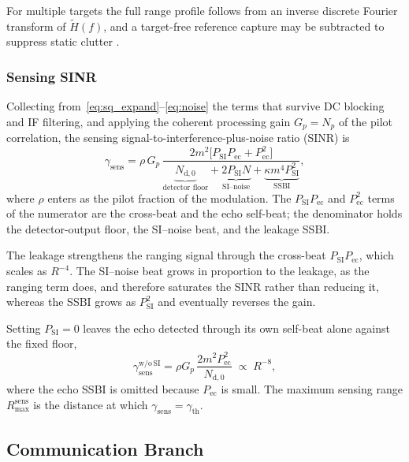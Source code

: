 \documentclass[10pt,journal,comsoc]{IEEEtran}
\begin{document}
For multiple targets the full range profile follows from an inverse
discrete Fourier transform of $\tilde H(f)$, and a target-free
reference capture may be subtracted to suppress static clutter
\cite{sturm_waveform_2011}.

\subsubsection{Sensing SINR}
Collecting from~\eqref{eq:sq_expand}--\eqref{eq:noise} the terms that
survive DC blocking and IF filtering, and applying the coherent
processing gain $G_p=N_p$ of the pilot correlation, the sensing
signal-to-interference-plus-noise ratio (SINR) is
\begin{equation}
\gamma_{\mathrm{sens}}=\rho\,G_p\,
\frac{2m^2\big[P_{\mathrm{SI}}P_{\mathrm{ec}}+P_{\mathrm{ec}}^2\big]}
{\underbrace{N_{\mathrm{d},0}}_{\text{detector floor}}
+\underbrace{2P_{\mathrm{SI}}N}_{\text{SI--noise}}
+\underbrace{\kappa m^4P_{\mathrm{SI}}^2}_{\text{SSBI}}},
\label{eq:sinr_sens}
\end{equation}
where $\rho$ enters as the pilot fraction of the modulation. The
$P_{\mathrm{SI}}P_{\mathrm{ec}}$ and $P_{\mathrm{ec}}^2$ terms of the
numerator are the cross-beat and the echo self-beat; the denominator
holds the detector-output floor, the SI--noise beat,
and the leakage SSBI.

The leakage strengthens the ranging signal through the cross-beat
$P_{\mathrm{SI}}P_{\mathrm{ec}}$, which scales as $R^{-4}$. The
SI--noise beat grows in proportion to the leakage, as the ranging term
does, and therefore saturates the SINR rather than reducing it, whereas
the SSBI grows as $P_{\mathrm{SI}}^2$ and eventually reverses the gain.

Setting $P_{\mathrm{SI}}=0$ leaves the echo detected through its own
self-beat alone against the fixed floor,
\begin{equation}
\gamma_{\mathrm{sens}}^{\mathrm{w/o\,SI}}
=\rho G_p\,\frac{2m^2P_{\mathrm{ec}}^2}{N_{\mathrm{d},0}}
\;\propto\;R^{-8},
\label{eq:sinr_nosi}
\end{equation}
where the echo SSBI is omitted because $P_{\mathrm{ec}}$ is small. The
maximum sensing range $R_{\max}^{\mathrm{sens}}$ is the distance at
which $\gamma_{\mathrm{sens}}=\gamma_{\mathrm{th}}$.

\subsection{Communication Branch}
\label{sec:comm_branch}
\end{document}
